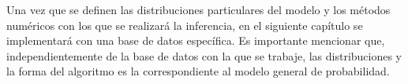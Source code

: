 Una vez que se definen las distribuciones particulares del modelo y los m\'etodos num\'ericos con los que se realizar\'a la inferencia, en el siguiente cap\'itulo se implementar\'a con una base de datos espec\'ifica. Es importante mencionar que, independientemente de la base de datos con la que se trabaje, las distribuciones y la forma del algoritmo es la correspondiente al modelo general de probabilidad.